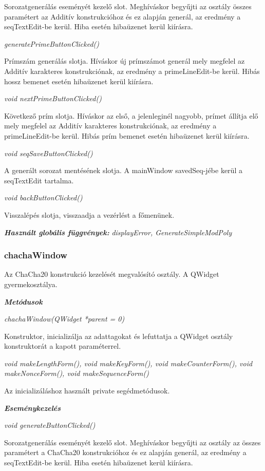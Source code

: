 \documentclass[hidelinks, 12pt]{article}
\begin{document}
Sorozatgenerálás eseményét kezelő slot. Meghíváskor begyűjti az osztály összes paramétert az Additív konstrukcióhoz és ez alapján generál, az eredmény a seqTextEdit-be kerül. Hiba esetén hibaüzenet kerül kiírásra.

\textit{generatePrimeButtonClicked()}

Prímszám generálás slotja. Híváskor új prímszámot generál mely megfelel az Additív karakteres konstrukciónak, az eredmény a primeLineEdit-be kerül. Hibás hossz bemenet esetén hibaüzenet kerül kiírásra.

\textit{void nextPrimeButtonClicked()}

Következő prím slotja. Híváskor az első, a jelenleginél nagyobb, prímet állítja elő mely megfelel az Additív karakteres konstrukciónak, az eredmény a primeLineEdit-be kerül. Hibás prím bemenet esetén hibaüzenet kerül kiírásra.

\textit{void seqSaveButtonClicked()}

A generált sorozat mentésének slotja. A mainWindow savedSeq-jébe kerül a seqTextEdit tartalma.

\textit{void backButtonClicked()}

Visszalépés slotja, visszaadja a vezérlést a főmenünek.

\textit{\textbf{Használt globális függvények: }}\textit{displayError, GenerateSimpleModPoly}

\subsubsection*{chachaWindow}

Az ChaCha20 konstrukció kezelését megvalósító osztály. A QWidget gyermekosztálya.

\textit{\textbf{Metódusok}}

\textit{chachaWindow(QWidget *parent = 0)}

Konstruktor, inicializálja az adattagokat és lefuttatja a QWidget osztály konstruktorát a kapott paraméterrel.

\textit{void makeLengthForm(), void makeKeyForm(), void makeCounterForm(), void makeNonceForm(), void makeSequenceForm()}

Az inicializáláshoz használt private segédmetódusok.

\textit{\textbf{Eseménykezelés}}

\textit{void generateButtonClicked()}

Sorozatgenerálás eseményét kezelő slot. Meghíváskor begyűjti az osztály az összes paramétert a ChaCha20 konstrukcióhoz és ez alapján generál, az eredmény a seqTextEdit-be kerül. Hiba esetén hibaüzenet kerül kiírásra.
\end{document}
